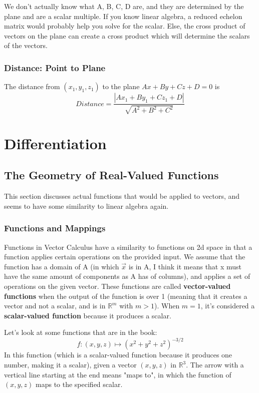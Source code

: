 \documentclass{article}
\begin{document}
We don't actually know what A, B, C, D are, and they are determined by
the plane and are a scalar multiple. If you know linear algebra, a reduced echelon matrix
would probably help you solve for the scalar. Else, the cross product of vectors on the plane
can create a cross product which will determine the scalars of the vectors.
\subsubsection{Distance: Point to Plane}
The distance from $(x_1, y_1, z_1)$ to the plane $Ax + By + Cz + D = 0$ is
\[
  Distance = \frac{|Ax_1 + By_1 + Cz_1 + D|}{\sqrt{A^2 + B^2 + C^2}}
\]

\section{Differentiation}

\subsection{The Geometry of Real-Valued Functions}
This section discusses actual functions that would be applied to vectors, and 
seems to have some similarity to linear algebra again.
\subsubsection{Functions and Mappings}
Functions in Vector Calculus have a similarity to functions on 2d space in that
a function applies certain operations on the provided input. We assume that 
the function has a domain of A (in which $\vec{x}$ is in A, I think it means that
x must have the same amount of components as A has of columns), and applies a set 
of operations on the given vector. These functions are called \textbf{vector-valued functions}
when the output of the function is over 1 (meaning that it creates a vector and not a 
scalar, and is in $\mathbb{R}^m$ with $m>1$). When $m = 1$, it's considered a \textbf{scalar-valued function}
because it produces a scalar.\newline

Let's look at some functions that are in the book:
\[
  f: (x,y,z) \mapsto (x^2 + y^2 + z^2)^{-3/2}
\]
In this function (which is a scalar-valued function because it produces one number,
making it a scalar), given a vector $(x,y,z)$ in $\mathbb{R}^3$.
The arrow with a vertical line starting at the end means "maps to", in which
the function of $(x,y,z)$ maps to the specified scalar.\newline
\end{document}

